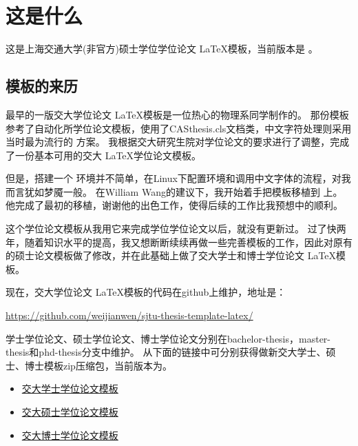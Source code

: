 
\chapter{这是什么}
\label{chap:what}

这是上海交通大学(非官方)硕士学位学位论文 \LaTeX 模板，当前版本是 \version 。

\section{模板的来历}

最早的一版交大学位论文 \LaTeX 模板是一位热心的物理系同学制作的。
那份模板参考了自动化所学位论文模板，使用了CASthesis.cls文档类，中文字符处理则采用当时最为流行的 \CJKLaTeX 方案。
我根据交大研究生院对学位论文的要求进行了调整，完成了一份基本可用的交大 \LaTeX 学位论文模板。

但是，搭建一个 \CJKLaTeX 环境并不简单，在Linux下配置环境和调用中文字体的流程，对我而言犹如梦魇一般。
在William Wang的建议下，我开始着手把模板移植到 \XeTeX 上。
他完成了最初的移植，谢谢他的出色工作，使得后续的工作比我预想中的顺利。

这个学位论文模板从我用它来完成学位学位论文以后，就没有更新过。
过了快两年，随着知识水平的提高，我又想断断续续再做一些完善模板的工作，因此对原有的硕士论文模板做了修改，并在此基础上做了交大学士和博士学位论文 \LaTeX 模板。

现在，交大学位论文 \LaTeX 模板的代码在github上维护，地址是：

	\url{https://github.com/weijianwen/sjtu-thesis-template-latex/}

学士学位论文、硕士学位论文、博士学位论文分别在bachelor-thesis，master-thesis和phd-thesis分支中维护。
从下面的链接中可分别获得做新交大学士、硕士、博士模板zip压缩包，当前版本为\version 。

\begin{itemize}
	\item \href{https://github.com/weijianwen/sjtu-thesis-template-latex/archive/bachelor-0.5.2.zip}{交大学士学位论文模板\version} 
	\item \href{https://github.com/weijianwen/sjtu-thesis-template-latex/archive/master-0.5.2.zip}{交大硕士学位论文模板\version}
	\item \href{https://github.com/weijianwen/sjtu-thesis-template-latex/archive/phd-0.5.2.zip}{交大博士学位论文模板\version}
\end{itemize}

